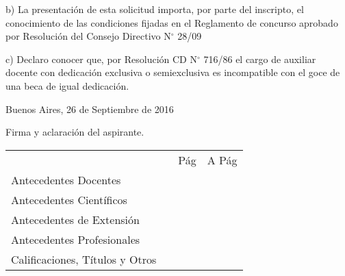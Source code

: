 \documentclass{article}
\newcommand{\fecha}[3]{#1 de #2 de #3}
\begin{document}
\noindent b) La presentaci\'on de esta solicitud importa, por parte del inscripto, el conocimiento de las condiciones fijadas en el Reglamento de concurso aprobado por Resoluci\'on del Consejo Directivo N$^\circ$  28/09

\noindent c) Declaro conocer que, por Resoluci\'on CD N$^\circ$ 716/86 el cargo de auxiliar docente con dedicaci\'on exclusiva o semiexclusiva es incompatible con el goce de una beca de igual dedicaci\'on.


\bigskip
\bigskip
\bigskip
\bigskip

\noindent Buenos Aires, \fecha{26}{Septiembre}{2016}

\bigskip
\bigskip
\bigskip

\noindent \hdashrule{6cm}{0.5pt}{0.75pt}

\noindent Firma y aclaraci\'on del aspirante.

\newpage


\bigskip
\bigskip

\noindent \begin{tabular}{lccc}

\vspace{0.3cm}

 &\hspace{2cm} &\textrm{\hspace{0.5cm} P\'ag \hspace{0.5cm}} & \textrm{\hspace{0.5cm} A P\'ag \hspace{0.5cm}} \\

\vspace{0.1cm}

\textrm{Antecedentes Docentes}& & ~\pageref{begin-docentes} & ~\pageref{end-docentes} \\

\vspace{0.1cm}

\textrm{Antecedentes Cient\'ificos}& & ~\pageref{begin-cientificos} & ~\pageref{end-cientificos} \\

\vspace{0.1cm}

\textrm{Antecedentes de Extensi\'on}& & ~\pageref{begin-extension} & ~\pageref{end-extension} \\

\vspace{0.1cm}

\textrm{Antecedentes Profesionales}& & ~\pageref{begin-profesionales} & ~\pageref{end-profesionales} \\

\vspace{0.1cm}

\textrm{Calificaciones, T\'itulos y Otros}& & ~\pageref{begin-otros} & ~\pageref{end-otros} \\

\end{tabular}
\end{document}
